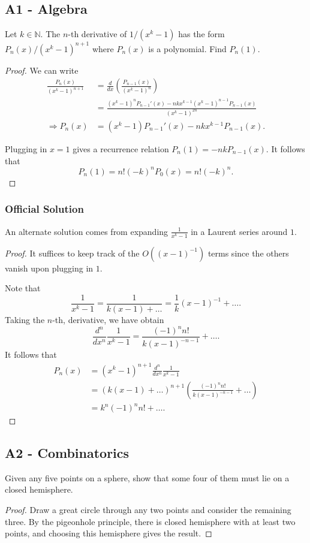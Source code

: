 \documentclass[11pt]{scrartcl}
\newcommand{\N}{\mathbb{N}}
\newcommand{\<}{\langle}
\renewcommand{\>}{\rangle}
\begin{document}
\subsection{A1 - Algebra}
Let $k \in \N$.  The $n$-th derivative of $1/(x^{k}-1)$ has the form $P_n(x)/(x^{k}-1)^{n+1}$ where $P_n(x)$ is a polynomial.  Find $P_n(1)$.
\begin{proof}
We can write 
\begin{align*}
\frac{P_{n}(x)}{(x^k-1)^{n+1}} &= \frac{d}{dx} \left( \frac{P_{n-1}(x)}{(x^k - 1)^n}\right) \\
&= \frac{(x^k - 1)^n P_{n-1}'(x) - nkx^{k-1}(x^k - 1)^{n-1} P_{n-1}(x)}{(x^k - 1)^{2n}} \\
\Longrightarrow P_n(x) &= (x^k -1)P_{n-1}'(x) - nkx^{k-1}P_{n-1}(x).
\end{align*}

Plugging in $x = 1$ gives a recurrence relation $P_n(1) = -nk P_{n-1}(x)$.  It follows that $$P_n(1) = n!(-k)^n P_0(x) = n!(-k)^n.$$

\end{proof}
\subsubsection{Official Solution}
An alternate solution comes from expanding $\frac{1}{x^k - 1}$ in a Laurent series around $1$.  
\begin{proof}
It suffices to keep track of the $O((x-1)^{-1})$ terms since the others vanish upon plugging in $1$.

Note that 
$$\frac{1}{x^k - 1} = \frac{1}{k(x-1) + \dots} = \frac{1}{k} (x-1)^{-1} + \dots.$$
Taking the $n$-th, derivative, we have obtain 
$$\frac{d^n}{dx^n} \frac{1}{x^k - 1} = \frac{(-1)^n n!}{k(x-1)^{-n-1}} + \dots.$$
It follows that 
\begin{align*}
P_n(x) &= (x^k - 1)^{n + 1} \frac{d^n}{dx^n} \frac{1}{x^k - 1} \\
&= (k(x-1) + \dots)^{n+1} \left(\frac{(-1)^n n!}{k(x-1)^{-n-1}} + \dots \right) \\
&= k^n (-1)^n n! + \dots.
\end{align*}
\end{proof}
\pagebreak
\subsection{A2 - Combinatorics}
Given any five points on a sphere, show that some four of them must lie on a closed hemisphere.  
\begin{proof}
Draw a great circle through any two points and consider the remaining three.  By the pigeonhole principle, there is closed hemisphere with at least two points, and choosing this hemisphere gives the result.  
\end{proof}
\pagebreak
\end{document}
